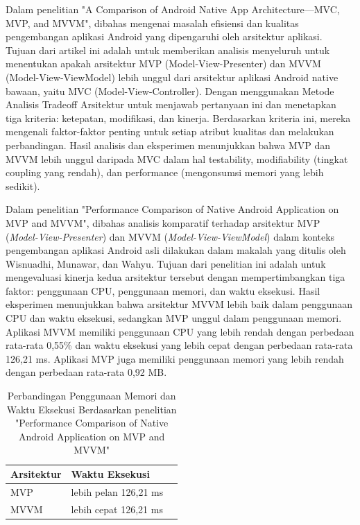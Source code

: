 \documentclass[conference]{IEEEtran}
\begin{document}
	
	Dalam penelitian "A Comparison of Android Native App Architecture—MVC, MVP, and MVVM"\cite{Perbandingan2}, dibahas mengenai masalah efisiensi dan kualitas pengembangan aplikasi Android yang dipengaruhi oleh arsitektur aplikasi. Tujuan dari artikel ini adalah untuk memberikan analisis menyeluruh untuk menentukan apakah arsitektur MVP (Model-View-Presenter) dan MVVM (Model-View-ViewModel) lebih unggul dari arsitektur aplikasi Android native bawaan, yaitu MVC (Model-View-Controller). Dengan menggunakan Metode Analisis Tradeoff Arsitektur untuk menjawab pertanyaan ini dan menetapkan tiga kriteria: ketepatan, modifikasi, dan kinerja. Berdasarkan kriteria ini, mereka mengenali faktor-faktor penting untuk setiap atribut kualitas dan melakukan perbandingan. Hasil analisis dan eksperimen menunjukkan bahwa MVP dan MVVM lebih unggul daripada MVC dalam hal testability, modifiability (tingkat coupling yang rendah), dan performance (mengonsumsi memori yang lebih sedikit).
	
	Dalam penelitian "Performance Comparison of Native Android Application on MVP and MVVM"\cite{Perbandingan3}, dibahas analisis komparatif terhadap arsitektur MVP (\textit{Model-View-Presenter}) dan MVVM (\textit{Model-View-ViewModel}) dalam konteks pengembangan aplikasi Android asli dilakukan dalam makalah yang ditulis oleh Wisnuadhi, Munawar, dan Wahyu. Tujuan dari penelitian ini adalah untuk mengevaluasi kinerja kedua arsitektur tersebut dengan mempertimbangkan tiga faktor: penggunaan CPU, penggunaan memori, dan waktu eksekusi. Hasil eksperimen menunjukkan bahwa arsitektur MVVM lebih baik dalam penggunaan CPU dan waktu eksekusi, sedangkan MVP unggul dalam penggunaan memori. Aplikasi MVVM memiliki penggunaan CPU yang lebih rendah dengan perbedaan rata-rata 0,55\% dan waktu eksekusi yang lebih cepat dengan perbedaan rata-rata 126,21 ms. Aplikasi MVP juga memiliki penggunaan memori yang lebih rendah dengan perbedaan rata-rata 0,92 MB.
	
	\begin{table}[ht]
		\centering
		\caption{Perbandingan Penggunaan Memori dan Waktu Eksekusi Berdasarkan penelitian "Performance Comparison of Native Android Application on MVP and MVVM"}
		\label{tab
		}
		\begin{tabular}{|l|l|l|}
			\hline
			\textbf{Arsitektur} & \textbf{Waktu Eksekusi} \\ \hline
			MVP & lebih pelan 126,21 ms\\ \hline
			MVVM & lebih cepat 126,21 ms \\ \hline
		\end{tabular}
	\end{table}
\end{document}
